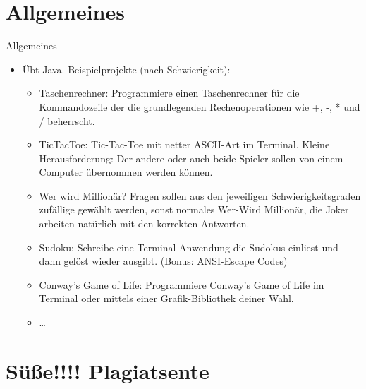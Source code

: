 \section{Allgemeines}
\begin{frame}[t,fragile]{Allgemeines}
    \begin{itemize}[<+(1)->]
        \item Übt Java. Beispielprojekte (nach Schwierigkeit):\smallskip \begin{itemize}
            \itemsep6pt
            \item Taschenrechner:\pause{} Programmiere einen Taschenrechner für die Kommandozeile der die grundlegenden Rechenoperationen wie +, -, * und / beherrscht.
            \item TicTacToe:\pause{} Tic-Tac-Toe mit netter ASCII-Art im Terminal.\pause{} Kleine Herausforderung: Der andere oder auch beide Spieler sollen von einem Computer übernommen werden können.
            \item Wer wird Millionär?\pause{} Fragen sollen aus den jeweiligen Schwierigkeitsgraden zufällige gewählt werden, sonst normales Wer-Wird Millionär, die Joker arbeiten natürlich mit den korrekten Antworten.
            \item Sudoku:\pause{} Schreibe eine Terminal-Anwendung die Sudokus einliest und dann gelöst wieder ausgibt. (Bonus: ANSI-Escape Codes)
            \item Conway's Game of Life:\pause{} Programmiere Conway's Game of Life im Terminal oder mittels einer Grafik-Bibliothek deiner Wahl.
            \item \ldots
        \end{itemize}
    \end{itemize}
\end{frame}

\section{Süße!!!! Plagiatsente}
\begin{frame}[c]
\pause\centering{}
\end{frame}

